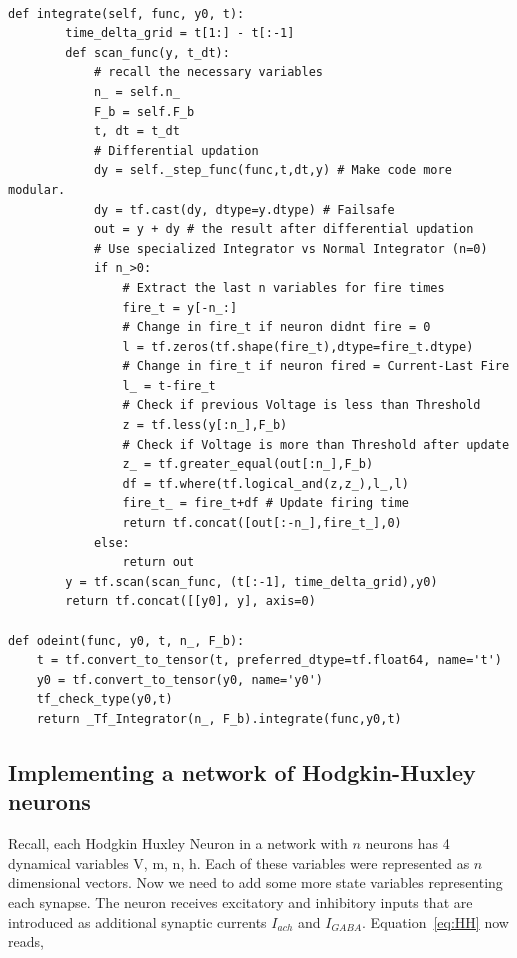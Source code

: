 \documentclass[10pt,letterpaper]{article}
\begin{document}
\begin{verbatim}

def integrate(self, func, y0, t): 
        time_delta_grid = t[1:] - t[:-1]
        def scan_func(y, t_dt): 
            # recall the necessary variables
            n_ = self.n_
            F_b = self.F_b
            t, dt = t_dt
            # Differential updation
            dy = self._step_func(func,t,dt,y) # Make code more modular.
            dy = tf.cast(dy, dtype=y.dtype) # Failsafe
            out = y + dy # the result after differential updation
            # Use specialized Integrator vs Normal Integrator (n=0)
            if n_>0:
                # Extract the last n variables for fire times
                fire_t = y[-n_:] 
                # Change in fire_t if neuron didnt fire = 0
                l = tf.zeros(tf.shape(fire_t),dtype=fire_t.dtype) 
                # Change in fire_t if neuron fired = Current-Last Fire
                l_ = t-fire_t 
                # Check if previous Voltage is less than Threshold
                z = tf.less(y[:n_],F_b)              
                # Check if Voltage is more than Threshold after update
                z_ = tf.greater_equal(out[:n_],F_b)  
                df = tf.where(tf.logical_and(z,z_),l_,l) 
                fire_t_ = fire_t+df # Update firing time 
                return tf.concat([out[:-n_],fire_t_],0)
            else:
                return out
        y = tf.scan(scan_func, (t[:-1], time_delta_grid),y0)
        return tf.concat([[y0], y], axis=0)
        
def odeint(func, y0, t, n_, F_b):
    t = tf.convert_to_tensor(t, preferred_dtype=tf.float64, name='t')
    y0 = tf.convert_to_tensor(y0, name='y0')
    tf_check_type(y0,t)
    return _Tf_Integrator(n_, F_b).integrate(func,y0,t)
\end{verbatim}

\subsection*{Implementing a network of Hodgkin-Huxley neurons}

Recall, each Hodgkin Huxley Neuron in a network with $n$ neurons has 4 dynamical variables V, m, n, h. Each of these variables were represented as $n$\textemdash dimensional vectors. Now we need to add some more state variables representing each synapse. The neuron receives excitatory and inhibitory inputs that are introduced as additional synaptic currents $I_{ach}$ and $I_{GABA}$. Equation~\ref{eq:HH} now reads, 
\end{document}
